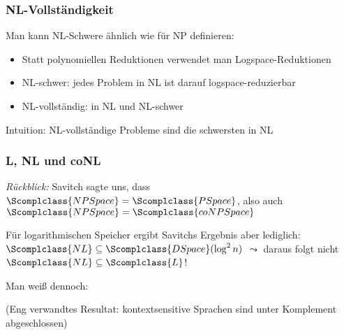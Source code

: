 \documentclass[aspectratio=1610,onlymath]{beamer}
\begin{document}
\begin{frame}\frametitle{NL-Vollständigkeit}

Man kann NL-Schwere ähnlich wie für NP definieren:
\begin{itemize}
\item Statt polynomiellen Reduktionen verwendet man Logspace-Reduktionen
\item NL-schwer: jedes Problem in NL ist darauf logspace-reduzierbar
\item NL-vollständig: in NL und NL-schwer
\end{itemize}
Intuition: NL-vollständige Probleme sind die schwersten in NL
\bigskip\pause

\bigskip\pause

\end{frame}

\begin{frame}\frametitle{L, NL und coNL}

\emph{Rückblick:} Savitch sagte uns, dass $\Scomplclass{NPSpace}=\Scomplclass{PSpace}$, also auch $\Scomplclass{NPSpace}=\Scomplclass{coNPSpace}$
\bigskip\pause

Für logarithmischen Speicher ergibt Savitchs Ergebnis aber lediglich: $\Scomplclass{NL}\subseteq\Scomplclass{DSpace}(\log^2 n)$
$\leadsto$ daraus folgt nicht $\Scomplclass{NL}\subseteq\Scomplclass{L}$!
\bigskip\pause

Man weiß dennoch:\bigskip

\pause\medskip

\bigskip

{\tiny
(Eng verwandtes Resultat: kontextsensitive Sprachen sind unter Komplement abgeschlossen)

}

\end{frame}

\end{document}
